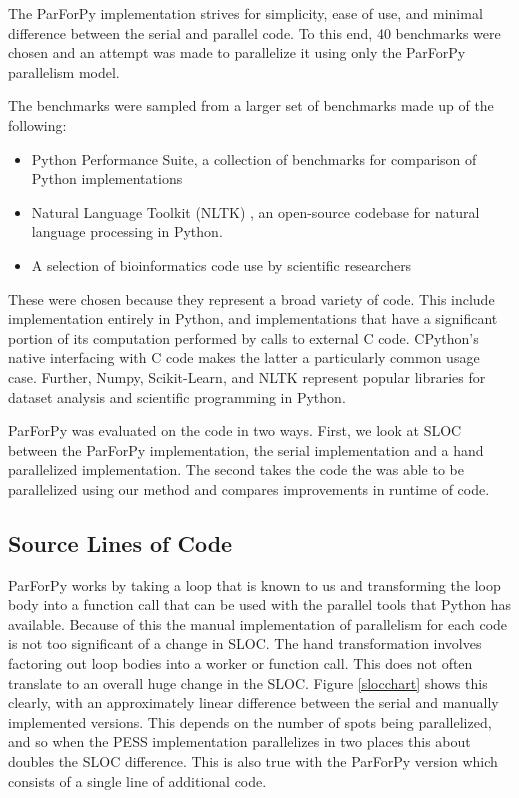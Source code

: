 \documentclass[conference]{IEEEtran}
\begin{document}
The ParForPy implementation strives for simplicity, ease of use, and minimal difference between the serial and parallel code.
To this end, 40 benchmarks were chosen and an attempt was made to parallelize it using only the ParForPy parallelism model.

The benchmarks were sampled from a larger set of benchmarks made up of the following:
\begin{itemize}
   \item Python Performance Suite\cite{pyPerformance}, a collection of benchmarks for comparison of Python implementations
   \item Natural Language Toolkit (NLTK) \cite{bird_2016}, an 
   open-source codebase for natural language processing in Python.
   \item A selection of bioinformatics code use by scientific researchers
\end{itemize}
These were chosen because they represent a broad variety of code. 
This include implementation entirely in Python, and implementations 
that have a significant portion of its computation performed by calls to external C code.
CPython's native interfacing with C code makes the latter a particularly common usage case.
Further, Numpy, Scikit-Learn, and NLTK represent popular libraries for dataset analysis and scientific programming in Python.


ParForPy was evaluated on the code in two ways. First, we look at SLOC between
the ParForPy implementation, the serial implementation and a hand parallelized implementation.
The second takes the code the was able to be parallelized using our method and compares improvements in runtime of code.


\subsection{Source Lines of Code}

ParForPy works by taking a loop that is known to us and transforming the loop body
into a function call that can be used with the parallel tools that Python has available.
Because of this the manual implementation of parallelism for each code is not too 
significant of a change in SLOC.
The hand transformation involves factoring out loop bodies into a worker or function call.
This does not often translate to an overall huge change in the SLOC.
Figure \ref{slocchart} shows this clearly, with an approximately linear difference
between the serial and manually implemented versions.
This depends on the number of spots being parallelized, and so when the PESS implementation parallelizes in two places this about doubles the SLOC difference.
This is also true with the ParForPy version which consists of a single line of additional
code.
\end{document}
